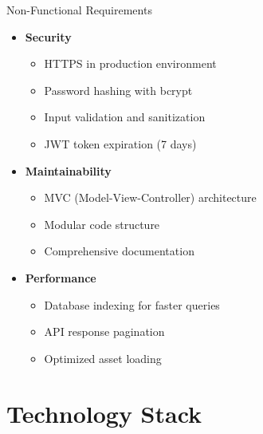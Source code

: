 \documentclass{beamer}
\begin{document}
\begin{frame}{Non-Functional Requirements}
\begin{itemize}
    \item \textbf{Security}
    \begin{itemize}
        \item HTTPS in production environment
        \item Password hashing with bcrypt
        \item Input validation and sanitization
        \item JWT token expiration (7 days)
    \end{itemize}
    
    \item \textbf{Maintainability}
    \begin{itemize}
        \item MVC (Model-View-Controller) architecture
        \item Modular code structure
        \item Comprehensive documentation
    \end{itemize}
    
    \item \textbf{Performance}
    \begin{itemize}
        \item Database indexing for faster queries
        \item API response pagination
        \item Optimized asset loading
    \end{itemize}
\end{itemize}
\end{frame}

\section{Technology Stack}
\end{document}

